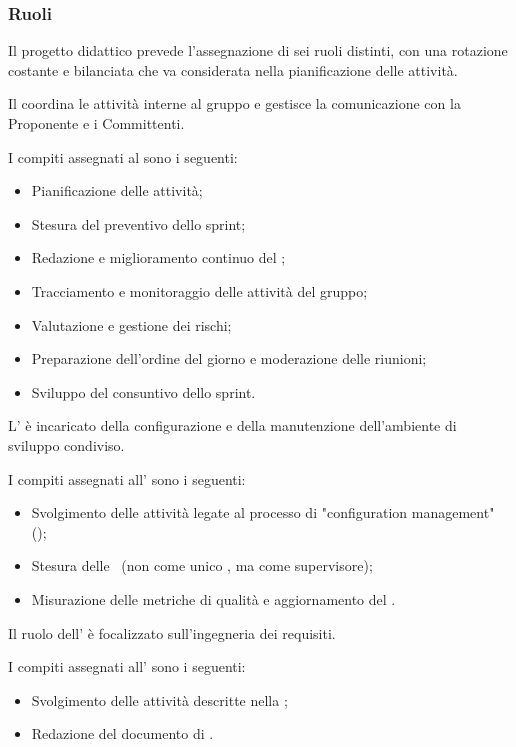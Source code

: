 \subsubsection{Ruoli}
\par Il progetto didattico prevede l'assegnazione di sei ruoli distinti, con una rotazione costante e bilanciata che va considerata nella pianificazione delle attività.

\par Il \Responsabile{} coordina le attività interne al gruppo e gestisce la comunicazione con la Proponente e i Committenti.
\par I compiti assegnati al \Responsabile{} sono i seguenti:
\begin{itemize}
  \item Pianificazione delle attività;
  \item Stesura del preventivo dello sprint;
  \item Redazione e miglioramento continuo del \PdP;
  \item Tracciamento e monitoraggio delle attività del gruppo;
  \item Valutazione e gestione dei rischi;
  \item Preparazione dell'ordine del giorno e moderazione delle riunioni;
  \item Sviluppo del consuntivo dello sprint.
\end{itemize}

\par L'\Amministratore{} è incaricato della configurazione e della manutenzione dell'ambiente di sviluppo condiviso.
\par I compiti assegnati all'\Amministratore{} sono i seguenti:
\begin{itemize}
  \item Svolgimento delle attività legate al processo di "configuration management" ();
  \item Stesura delle \NdP\ (non come unico \Redattore{}, ma come supervisore);
  \item Misurazione delle metriche di qualità e aggiornamento del \PdQ.
\end{itemize}

\par Il ruolo dell'\Analista{} è focalizzato sull'ingegneria dei requisiti.
\par I compiti assegnati all'\Analista{} sono i seguenti:
\begin{itemize}
  \item Svolgimento delle attività descritte nella ;
  \item Redazione del documento di \AdR.
\end{itemize}

